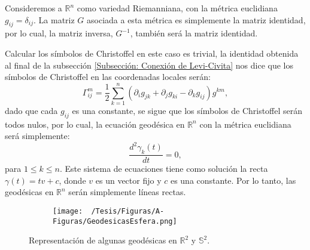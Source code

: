 \begin{example}
	Consideremos a $\mathbb{R}^{n}$ como variedad Riemanniana, con la métrica euclidiana $g_{ij} = \delta_{ij}$. La matriz $G$ asociada a esta métrica es simplemente la matriz identidad, por lo cual, la matriz inversa, $G^{-1}$, también será la matriz identidad.

	Calcular los símbolos de Christoffel en este caso es trivial, la identidad obtenida al final de la subsección \ref{Subsección: Conexión de Levi-Civita} nos dice que los símbolos de Christoffel en las coordenadas locales serán:
	\[
		\Gamma_{ij}^{m} = \frac{1}{2} \sum_{k=1}^{n}  (\partial_{i}g_{jk} + \partial_{j}g_{ki} - \partial_{k}g_{ij}) g^{km},
	\]
	dado que cada $g_{ij}$ es una constante, se sigue que los símbolos de Christoffel serán todos nulos, por lo cual, la ecuación geodésica en $\mathbb{R}^n$ con la métrica euclidiana será simplemente:
	\[
		\frac{d^{2}\gamma_k(t)}{dt} = 0,
	\]
	para $1 \leq k \leq n$. Este sistema de ecuaciones tiene como solución la recta $\gamma(t) = tv + c$, donde $v$ es un vector fijo y $c$ es una constante. Por lo tanto, las geodésicas en $\mathbb{R}^n$ serán simplemente líneas rectas.
\end{example}

\begin{center}
	\begin{figure}[h]
		\centering
		\begin{subfigure}{0.45\textwidth}
			\centering
			
		\end{subfigure}
		\begin{subfigure}{0.5\textwidth}
			\centering
			\texttt{[image: ~/Tesis/Figuras/A-Figuras/GeodesicasEsfera.png]}
		\end{subfigure}
    \caption{Representación de algunas geodésicas en $\mathbb{R}^{2}$ y $\mathbb{S}^{2}$.}
	\end{figure}
\end{center}
